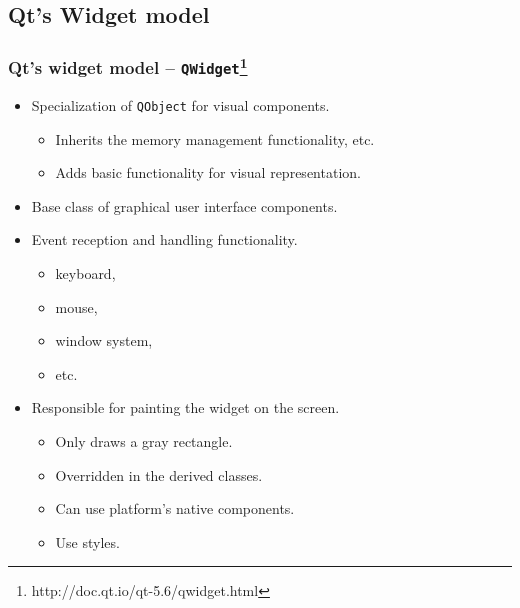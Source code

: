 \subsection{Qt's Widget model}

\begin{frame}
  \frametitle{Qt's widget model -- \texttt{QWidget}\footnote
    {http://doc.qt.io/qt-5.6/qwidget.html}}
  \begin{itemize}
    \item Specialization of \texttt{QObject} for visual components.
    \begin{itemize}
      \item Inherits the memory management functionality, etc.
      \item Adds basic functionality for visual representation.
    \end{itemize}
    \item Base class of graphical user interface components.
    \item Event reception and handling functionality.
    \begin{itemize}
      \item keyboard,
      \item mouse,
      \item window system,
      \item etc.
    \end{itemize}
    \item Responsible for painting the widget on the screen.
    \begin{itemize}
      \item Only draws a gray rectangle.
      \item Overridden in the derived classes.
      \item Can use platform's native components.
      \item Use styles.
    \end{itemize}
  \end{itemize}
\end{frame}


